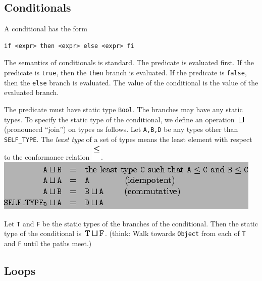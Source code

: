 \documentclass[]{article}
\begin{document}
\subsection{Conditionals}

A conditional has the form

\begin{verbatim}
if <expr> then <expr> else <expr> fi
\end{verbatim}

The semantics of conditionals is standard. The predicate is evaluated
first. If the predicate is \texttt{true}, then the \texttt{then} branch
is evaluated. If the predicate is \texttt{false}, then the \texttt{else}
branch is evaluated. The value of the conditional is the value of the
evaluated branch.

The predicate must have static type \texttt{Bool}. The branches may have
any static types. To specify the static type of the conditional, we
define an operation \includegraphics{img21.png} (pronounced ``join'') on
types as follows. Let \texttt{A,B,D} be any types other than
\texttt{SELF\_TYPE}. The \emph{least type} of a set of types means the
least element with respect to the conformance relation
\includegraphics{img22.png}. \\

\includegraphics{img23.png}

Let \texttt{T} and \texttt{F} be the static types of the branches of the
conditional. Then the static type of the conditional is
\includegraphics{img24.png}. (think: Walk towards \texttt{Object} from
each of \texttt{T} and \texttt{F} until the paths meet.)

\subsection{Loops}
\end{document}
